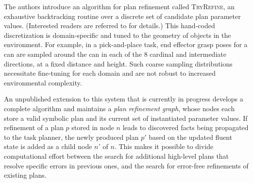 The authors introduce an algorithm for plan refinement
called \textsc{TryRefine}, an exhaustive backtracking routine over a discrete set of candidate
plan parameter values. (Interested readers are referred to \cite{srivastava2014combined} for details.)
This hand-coded discretization is domain-specific and tuned to the geometry of objects in the
environment. For example, in a pick-and-place task, end effector grasp poses for a can are
sampled around the can in each of the 8 cardinal and intermediate directions, at a fixed distance and height.
Such coarse sampling distributions necessitate fine-tuning for each domain and are not robust to
increased environmental complexity.

An unpublished extension to this system that is currently in progress develops a complete algorithm and
maintains a \emph{plan refinement graph}, whose nodes each store a valid symbolic plan and
its current set of instantiated parameter values. If refinement of a plan $p$ stored in node
$n$ leads to discovered facts being propagated to the task planner, the newly produced plan $p'$ based on
the updated fluent state is added as a child node $n'$ of $n$. This makes it possible to divide computational
effort between the search for additional high-level plans that resolve specific errors in previous ones,
and the search for error-free refinements of existing plans.



